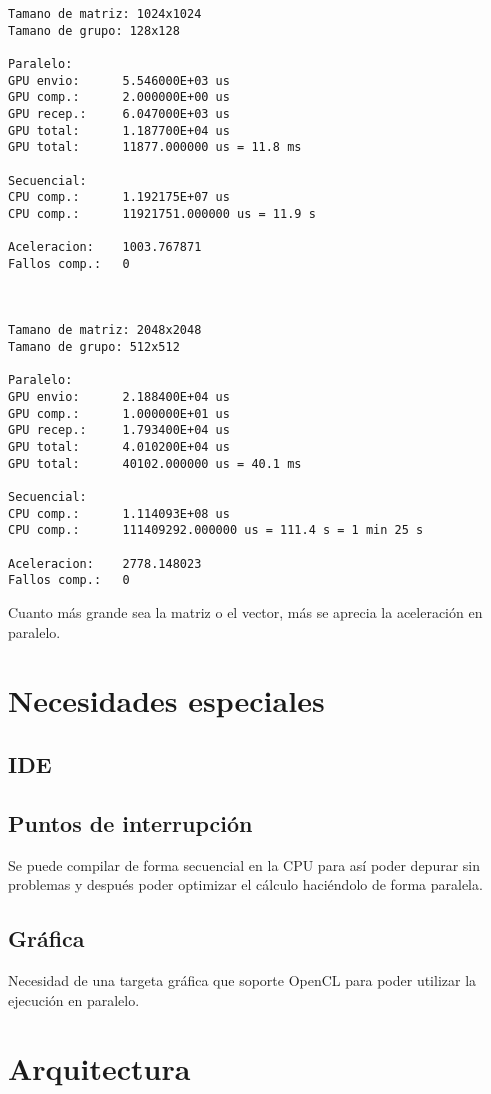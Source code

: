 \documentclass[12pt,a4paper]{article}
\begin{document}
\begin{lstlisting}
Tamano de matriz: 1024x1024
Tamano de grupo: 128x128

Paralelo:
GPU envio:      5.546000E+03 us
GPU comp.:      2.000000E+00 us
GPU recep.:     6.047000E+03 us
GPU total:      1.187700E+04 us
GPU total:      11877.000000 us = 11.8 ms

Secuencial:
CPU comp.:      1.192175E+07 us
CPU comp.:      11921751.000000 us = 11.9 s

Aceleracion:    1003.767871
Fallos comp.:   0



Tamano de matriz: 2048x2048
Tamano de grupo: 512x512

Paralelo:
GPU envio:      2.188400E+04 us
GPU comp.:      1.000000E+01 us
GPU recep.:     1.793400E+04 us
GPU total:      4.010200E+04 us
GPU total:      40102.000000 us = 40.1 ms

Secuencial:
CPU comp.:      1.114093E+08 us
CPU comp.:      111409292.000000 us = 111.4 s = 1 min 25 s

Aceleracion:    2778.148023
Fallos comp.:   0

\end{lstlisting}

Cuanto más grande sea la matriz o el vector, más se aprecia la aceleración en
paralelo.
\section{Necesidades especiales}
\subsection{IDE}
\subsection{Puntos de interrupción}
Se puede compilar de forma secuencial en la CPU para así poder depurar sin
problemas y después poder optimizar el cálculo haciéndolo de forma paralela.
\subsection{Gráfica}
Necesidad de una targeta gráfica que soporte OpenCL para poder utilizar la
ejecución en paralelo.
\section{Arquitectura}
\end{document}
